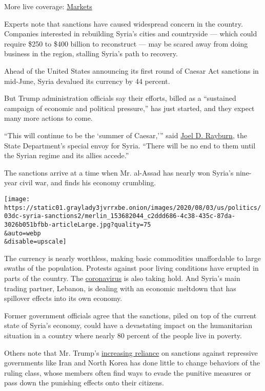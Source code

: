 More live coverage:
\href{https://www.nytimes3xbfgragh.onion/live/2020/08/04/business/stock-market-today-coronavirus?action=click\&pgtype=Article\&state=default\&region=MAIN_CONTENT_1\&context=storylines_live_updates}{Markets}

Experts note that sanctions have caused widespread concern in the
country. Companies interested in rebuilding Syria's cities and
countryside --- which could require \$250 to \$400 billion to
reconstruct --- may be scared away from doing business in the region,
stalling Syria's path to recovery.

Ahead of the United States announcing its first round of Caesar Act
sanctions in mid-June, Syria devalued its currency by 44 percent.

But Trump administration officials say their efforts, billed as a
``sustained campaign of economic and political pressure,'' has just
started, and they expect many more actions to come.

``This will continue to be the `summer of Caesar,''' said
\href{https://www.state.gov/biographies/joel-d-rayburn/}{Joel D.
Rayburn}, the State Department's special envoy for Syria. ``There will
be no end to them until the Syrian regime and its allies accede.''

The sanctions arrive at a time when Mr. al-Assad has nearly won Syria's
nine-year civil war, and finds his economy crumbling.

\texttt{[image: https://static01.graylady3jvrrxbe.onion/images/2020/08/03/us/politics/03dc-syria-sanctions2/merlin\_153682044\_c2ddd686-4c38-435c-87da-3026b051bfbb-articleLarge.jpg?quality=75\\\&auto=webp\\\&disable=upscale]}

The currency is nearly worthless, making basic commodities unaffordable
to large swaths of the population. Protests against poor living
conditions have erupted in parts of the country. The
\href{https://www.nytimes3xbfgragh.onion/interactive/2020/world/coronavirus-maps.html}{coronavirus}
is also taking hold. And Syria's main trading partner, Lebanon, is
dealing with an economic meltdown that has spillover effects into its
own economy.

Former government officials agree that the sanctions, piled on top of
the current state of Syria's economy, could have a devastating impact on
the humanitarian situation in a country where nearly 80 percent of the
people live in poverty.

Others note that Mr. Trump's
\href{https://www.nytimes3xbfgragh.onion/2019/11/15/us/politics/trump-iran-sanctions.html}{increasing
reliance} on sanctions against repressive governments like Iran and
North Korea has done little to change behaviors of the ruling class,
whose members often find ways to evade the punitive measures or pass
down the punishing effects onto their citizens.

